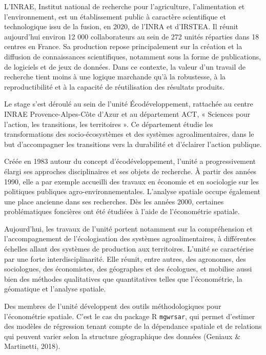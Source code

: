 \documentclass[11pt,a4paper]{article}
\begin{document}
L'INRAE, Institut national de recherche pour l'agriculture, l'alimentation et l'environnement, est un établissement public à caractère scientifique et technologique issu de la fusion, en 2020, de l'INRA et d'IRSTEA. Il réunit aujourd'hui environ 12 000 collaborateurs au sein de 272 unités réparties dans 18 centres en France. Sa production repose principalement sur la création et la diffusion de connaissances scientifiques, notamment sous la forme de publications, de logiciels et de jeux de données. Dans ce contexte, la valeur d'un travail de recherche tient moins à une logique marchande qu'à la robustesse, à la reproductibilité et à la capacité de réutilisation des résultats produits.

Le stage s'est déroulé au sein de l'unité Écodéveloppement, rattachée au centre INRAE Provence-Alpes-Côte d'Azur et au département ACT, « Sciences pour l'action, les transitions, les territoires ». Ce département étudie les transformations des socio-écosystèmes et des systèmes agroalimentaires, dans le but d'accompagner les transitions vers la durabilité et d'éclairer l'action publique.

Créée en 1983 autour du concept d'écodéveloppement, l'unité a progressivement élargi ses approches disciplinaires et ses objets de recherche. À partir des années 1990, elle a par exemple accueilli des travaux en économie et en sociologie sur les politiques publiques agro-environnementales. L'analyse spatiale occupe également une place ancienne dans ses recherches. Dès les années 2000, certaines problématiques foncières ont été étudiées à l'aide de l'économétrie spatiale.

Aujourd'hui, les travaux de l'unité portent notamment sur la compréhension et l'accompagnement de l'écologisation des systèmes agroalimentaires, à différentes échelles allant des systèmes de production aux territoires. L'unité se caractérise par une forte interdisciplinarité. Elle réunit, entre autres, des agronomes, des sociologues, des économistes, des géographes et des écologues, et mobilise aussi bien des méthodes qualitatives que quantitatives telles que l'économétrie, la géomatique et l'analyse spatiale.

Des membres de l'unité développent des outils méthodologiques pour l'économétrie spatiale. C'est le cas du package R \texttt{mgwrsar}, qui permet d'estimer des modèles de régression tenant compte de la dépendance spatiale et de relations qui peuvent varier selon la structure géographique des données (Geniaux \& Martinetti, 2018).
\end{document}
